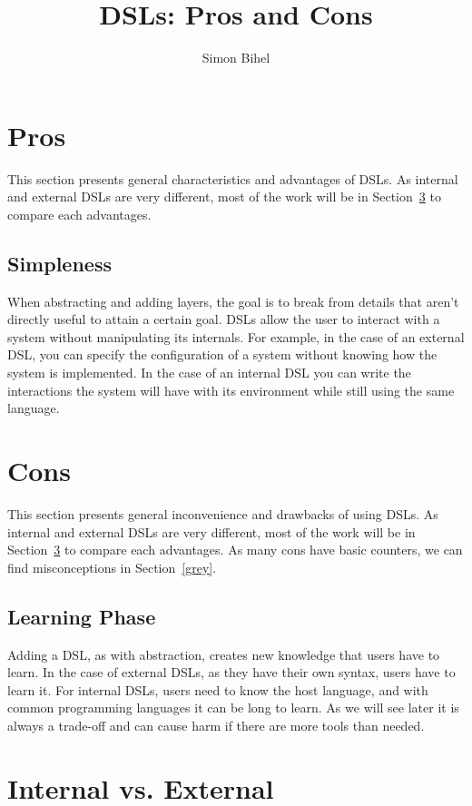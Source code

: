 \documentclass{proc}
\title{DSLs: Pros and Cons}
\author{Simon Bihel}
\begin{document}
\maketitle

\section{Pros}
\label{pros}
This section presents general characteristics and advantages of DSLs. As
internal and external DSLs are very different, most of the work will be in
Section~\ref{int_vs_ext} to compare each advantages.

\subsection{Simpleness}
When abstracting and adding layers, the goal is to break from details that
aren't directly useful to attain a certain goal. DSLs allow the user to interact
with a system without manipulating its internals. For example, in the case of an
external DSL, you can specify the configuration of a system without knowing how
the system is implemented. In the case of an internal DSL you can write the
interactions the system will have with its environment while still using the
same language.


\section{Cons}
\label{cons}
This section presents general inconvenience and drawbacks of using DSLs. As
internal and external DSLs are very different, most of the work will be in
Section~\ref{int_vs_ext} to compare each advantages. As many cons have basic
counters, we can find misconceptions in Section~\ref{grey}.

\subsection{Learning Phase}
Adding a DSL, as with abstraction, creates new knowledge that users have to
learn. In the case of external DSLs, as they have their own syntax, users have
to learn it. For internal DSLs, users need to know the host language, and with
common programming languages it can be long to learn. As we will see later it is
always a trade-off and can cause harm if there are more tools than needed.


\section{Internal vs. External}
\label{int_vs_ext}
\end{document}
